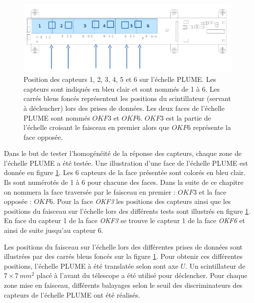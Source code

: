   \begin{figure}[!htb]
    \begin{center} 
     \includegraphics[scale=0.50]{./figures/Plots_PLUME/config_PLUME.png}
     \caption{Position des capteurs 1, 2, 3, 4, 5 et 6 sur l'\'echelle PLUME. Les capteurs sont indiqu\'es en bleu clair et sont nomm\'es de 1 \`a 6. Les carr\'es bleus fonc\'es repr\'esentent les positions du scintillateur (servant \`a d\'eclencher) lors des prises de donn\'ees. Les deux faces de l'\'echelle PLUME sont nomm\'es $OKF3$ et $OKF6$. $OKF3$ est la partie de l'\'echelle croisant le faisceau en premier alors que $OKF6$ repr\'esente la face oppos\'ee.}
     \label{fig:runsPLUME}
    \end{center}
  \end{figure}
  
  Dans le but de tester l'homog\'en\'eit\'e de la r\'eponse des capteurs, chaque zone de l'\'echelle PLUME a \'et\'e test\'ee. Une illustration d'une face de l'\'echelle PLUME est donn\'ee en figure \ref{fig:runsPLUME}. Les 6 capteurs de la face pr\'esent\'ee sont color\'es en bleu clair. 
  Ils sont num\'erot\'es de 1 \`a 6 pour chacune des faces. Dans la suite de ce chapitre on nommera la face travers\'ee par le faisceau en premier : $OKF3$ et la face oppos\'ee : $OKF6$. Pour la face \textit{OKF3} les positions des capteurs ainsi que les positions du faisceau sur l'\'echelle lors des différents tests sont illustr\'es en figure \ref{fig:runsPLUME}. En face du capteur 1 de la face \textit{OKF3} se trouve le capteur 1 de la face \textit{OKF6} et ainsi de suite jusqu'au capteur 6.
  
  \medskip
  
  Les positions du faisceau sur l'\'echelle lors des diff\'erentes prises de donn\'ees sont illustr\'ees par des carr\'es bleus fonc\'es sur la figure \ref{fig:runsPLUME}. Pour obtenir ces diff\'erentes positions, l'\'echelle PLUME \`a \'et\'e translat\'ee selon sont axe $U$. Un scintillateur de $7 \times 7 \, mm^2$ plac\'e \`a l'avant du t\'elescope a \'et\'e utilis\'e pour d\'eclencher. Pour chaque zone mise en faisceau, diff\'erents balayages selon le seuil des discriminateurs des capteurs de l'\'echelle PLUME ont \'et\'e r\'ealis\'es.

